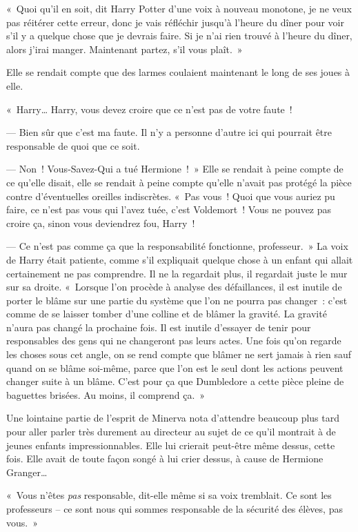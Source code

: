 «~Quoi qu'il en soit, dit Harry Potter d'une voix à nouveau monotone, je ne veux pas réitérer cette erreur, donc je vais réfléchir jusqu'à l'heure du dîner pour voir s'il y a quelque chose que je devrais faire. Si je n'ai rien trouvé à l'heure du dîner, alors j'irai manger. Maintenant partez, s'il vous plaît.~»

Elle se rendait compte que des larmes coulaient maintenant le long de ses joues à elle.

«~Harry… Harry, vous devez croire que ce n'est pas de votre faute~!

--- Bien sûr que c'est ma faute. Il n'y a personne d'autre ici qui pourrait être responsable de quoi que ce soit.

--- Non~! Vous-Savez-Qui a tué Hermione~!~» Elle se rendait à peine compte de ce qu'elle disait, elle se rendait à peine compte qu'elle n'avait pas protégé la pièce contre d'éventuelles oreilles indiscrètes. «~Pas vous~! Quoi que vous auriez pu faire, ce n'est pas vous qui l'avez tuée, c'est Voldemort~! Vous ne pouvez pas croire ça, sinon vous deviendrez fou, Harry~!

--- Ce n'est pas comme ça que la responsabilité fonctionne, professeur.~» La voix de Harry était patiente, comme s'il expliquait quelque chose à un enfant qui allait certainement ne pas comprendre. Il ne la regardait plus, il regardait juste le mur sur sa droite. «~Lorsque l'on procède à analyse des défaillances, il est inutile de porter le blâme sur une partie du système que l'on ne pourra pas changer~: c'est comme de se laisser tomber d'une colline et de blâmer la gravité. La gravité n'aura pas changé la prochaine fois. Il est inutile d'essayer de tenir pour responsables des gens qui ne changeront pas leurs actes. Une fois qu'on regarde les choses sous cet angle, on se rend compte que blâmer ne sert jamais à rien sauf quand on se blâme soi-même, parce que l'on est le seul dont les actions peuvent changer suite à un blâme. C'est pour ça que Dumbledore a cette pièce pleine de baguettes brisées. Au moins, il comprend ça.~»

Une lointaine partie de l'esprit de Minerva nota d'attendre beaucoup plus tard pour aller parler très durement au directeur au sujet de ce qu'il montrait à de jeunes enfants impressionnables. Elle lui crierait peut-être même dessus, cette fois. Elle avait de toute façon songé à lui crier dessus, à cause de Hermione Granger…

«~Vous n'êtes \emph{pas} responsable, dit-elle même si sa voix tremblait. Ce sont les professeurs -- ce sont nous qui sommes responsable de la sécurité des élèves, pas vous.~»

